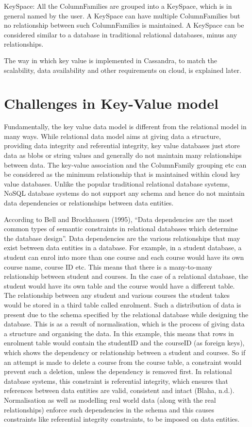 KeySpace: All the ColumnFamilies are grouped into a KeySpace, which is in
general named by the user. A KeySpace can have multiple ColumnFamilies but no
relationship between such ColumnFamilies is maintained. A KeySpace can be
considered similar to a database in traditional relational databases, minus any
relationships.

The way in which key value is implemented in Cassandra, to match the
scalability, data availability and other requirements on cloud, is explained
later.


\section{Challenges in Key-Value model}\label{s:challenges-key-value}
Fundamentally, the key value data model is different from the relational model
in many ways. While relational data model aims at giving data a structure,
providing data integrity and referential integrity, key value databases just
store data as blobs or string values and generally do not maintain many
relationships between data. The key-value association and the ColumnFamily
grouping etc can be considered as the minimum relationship that is maintained
within cloud key value databases. Unlike the popular traditional relational
database systems, \ac{NoSQL} database systems do not support any schema and hence do
not maintain data dependencies or relationships between data entities.

According to Bell and Brockhausen (1995), ``Data dependencies are the most
common types of semantic constraints in relational databases which determine the
database design''. Data dependencies are the various relationships that may
exist between data entities in a database. For example, in a student database, a
student can enrol into more than one course and each course would have its own
course name, course ID etc. This means that there is a many-to-many relationship
between student and courses. In the case of a relational database, the student
would have its own table and the course would have a different table. The
relationship between any student and various courses the student takes would be
stored in a third table called enrolment. Such a distribution of data is present
due to the schema specified by the relational database while designing the
database. This is as a result of normalisation, which is the process of giving
data a structure and organising the data. In this example, this means that rows
in enrolment table would contain the studentID and the courseID (as foreign
keys), which shows the dependency or relationship between a student and courses.
So if an attempt is made to delete a course from the course table, a constraint
would prevent such a deletion, unless the dependency is removed first. In
relational database systems, this constraint is referential integrity, which
ensures that references between data entities are valid, consistent and intact
(Blaha, n.d.). Normalisation as well as modelling real world data (along with
the real relationships) enforce such dependencies in the schema and this causes
constraints like referential integrity constraints, to be imposed on data
entities.

